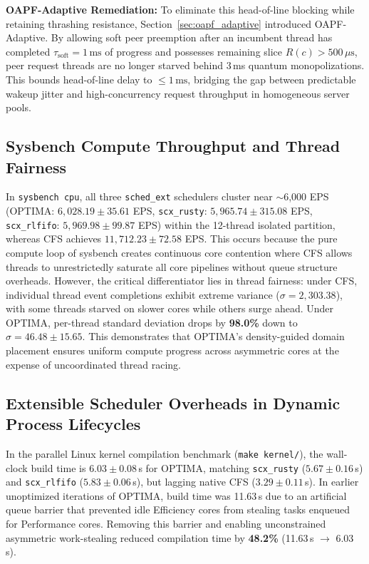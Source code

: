 \documentclass[conference]{IEEEtran}
\begin{document}
\textbf{OAPF-Adaptive Remediation:} To eliminate this head-of-line blocking while retaining thrashing resistance, Section~\ref{sec:oapf_adaptive} introduced OAPF-Adaptive. By allowing soft peer preemption after an incumbent thread has completed $\tau_{\mathrm{soft}} = 1\,\mathrm{ms}$ of progress and possesses remaining slice $R(c) > 500\,\mu\mathrm{s}$, peer request threads are no longer starved behind 3\,ms quantum monopolizations. This bounds head-of-line delay to $\le 1\,\mathrm{ms}$, bridging the gap between predictable wakeup jitter and high-concurrency request throughput in homogeneous server pools.

\subsection{Sysbench Compute Throughput and Thread Fairness}
In \texttt{sysbench cpu}, all three \texttt{sched\_ext} schedulers cluster near $\sim$6,000 EPS (OPTIMA: $6{,}028.19 \pm 35.61$ EPS, \texttt{scx\_rusty}: $5{,}965.74 \pm 315.08$ EPS, \texttt{scx\_rlfifo}: $5{,}969.98 \pm 99.87$ EPS) within the 12-thread isolated partition, whereas CFS achieves $11{,}712.23 \pm 72.58$ EPS. This occurs because the pure compute loop of sysbench creates continuous core contention where CFS allows threads to unrestrictedly saturate all core pipelines without queue structure overheads. However, the critical differentiator lies in thread fairness: under CFS, individual thread event completions exhibit extreme variance ($\sigma = 2{,}303.38$), with some threads starved on slower cores while others surge ahead. Under OPTIMA, per-thread standard deviation drops by \textbf{98.0\%} down to $\sigma = 46.48 \pm 15.65$. This demonstrates that OPTIMA's density-guided domain placement ensures uniform compute progress across asymmetric cores at the expense of uncoordinated thread racing.

\subsection{Extensible Scheduler Overheads in Dynamic Process Lifecycles}
In the parallel Linux kernel compilation benchmark (\texttt{make kernel/}), the wall-clock build time is $6.03 \pm 0.08$\,s for OPTIMA, matching \texttt{scx\_rusty} ($5.67 \pm 0.16$\,s) and \texttt{scx\_rlfifo} ($5.83 \pm 0.06$\,s), but lagging native CFS ($3.29 \pm 0.11$\,s). In earlier unoptimized iterations of OPTIMA, build time was 11.63\,s due to an artificial queue barrier that prevented idle Efficiency cores from stealing tasks enqueued for Performance cores. Removing this barrier and enabling unconstrained asymmetric work-stealing reduced compilation time by \textbf{48.2\%} (11.63\,s $\to$ 6.03\,s).
\end{document}
